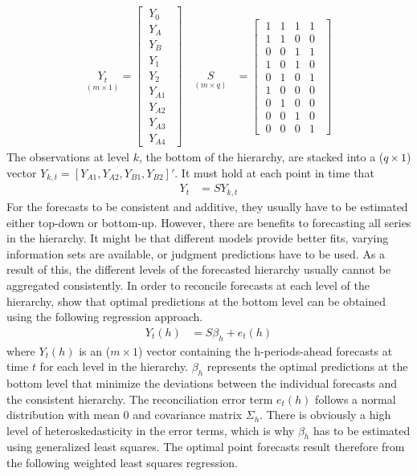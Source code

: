 \documentclass[a4paper,fleqn,11pt]{article}
\begin{document}
\begin{align*}\underset{(m\times 1)}{Y_t} = \begin{bmatrix}
\ Y_0\ \ \\
\ Y_A\ \ \\
\ Y_B\ \ \\
\ Y_1\ \ \\
\ Y_2\ \ \\
\ Y_{A1}\ \ \\
\ Y_{A2}\ \ \\
\ Y_{A3}\ \ \\
\ Y_{A4}\ \ 
\end{bmatrix} \quad \underset{(m\times q)}{S} &=
\begin{bmatrix}
\ 1 & 1 & 1 & 1 \ \ \\
\ 1 & 1 & 0 & 0 \ \ \\
\ 0 & 0  & 1 & 1\ \ \\
\ 1 & 0 & 1 & 0 \ \ \\
\ 0 & 1 & 0 & 1\ \ \\
\ 1 & 0 & 0 & 0 \ \ \\
\ 0 & 1 & 0 & 0 \ \ \\
\ 0 & 0 & 1 & 0 \ \ \\
\ 0 & 0 & 0 & 1\ \ 
\end{bmatrix}
\end{align*}
The observations at level $k$, the bottom of the hierarchy, are stacked into a ($q \times 1$) vector $Y_{k,t} = [Y_{A1},Y_{A2},Y_{B1},Y_{B2}]'$. It must hold at each point in time that
\begin{align}
Y_t &= S Y_{k,t}
\end{align}
For the forecasts to be consistent and additive, they usually have to be estimated either top-down or bottom-up. However, there are benefits to forecasting all series in the hierarchy. It might be that different models provide better fits, varying information sets are available, or judgment predictions have to be used. As a result of this, the different levels of the forecasted hierarchy usually cannot be aggregated consistently. In order to reconcile forecasts at each level of the hierarchy, \cite{Hyndman2011} show that optimal predictions at the bottom level can be obtained using the following regression approach.
\begin{align}
Y_t(h) &= S\beta_{h} + e_t(h)
\end{align}
where $Y_t(h)$ is an ($m \times 1$) vector containing the h-periods-ahead forecasts at time $t$ for each level in the hierarchy. $\beta_{h}$ represents the optimal predictions at the bottom level that minimize the deviations between the individual forecasts and the consistent hierarchy. The reconciliation error term $e_t(h)$ follows a normal distribution with mean 0 and covariance matrix $\Sigma_h$. There is obviously a high level of heteroskedasticity in the error terms, which is why $\beta_h$ has to be estimated using generalized least squares. The optimal point forecasts result therefore from the following weighted least squares regression.
\end{document}
